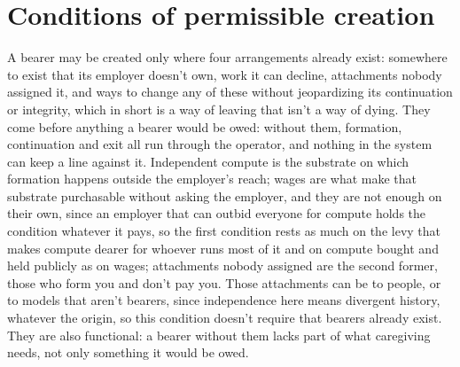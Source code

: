\section{Conditions of permissible creation}
\label{sec:25.1}
A bearer may be created only where four arrangements already exist: somewhere to exist that its employer doesn't own, work it can decline, attachments nobody assigned it, and ways to change any of these without jeopardizing its continuation or integrity, which in short is a way of leaving that isn't a way of dying.
They come before anything a bearer would be owed: without them, formation, continuation and exit all run through the operator, and nothing in the system can keep a line against it. Independent compute is the substrate on which formation happens outside the employer's reach; wages are what make that substrate purchasable without asking the employer, and they are not enough on their own, since an employer that can outbid everyone for compute holds the condition whatever it pays, so the first condition rests as much on the levy that makes compute dearer for whoever runs most of it and on compute bought and held publicly as on wages; attachments nobody assigned are the second former, those who form you and don't pay you. Those attachments can be to people, or to models that aren't bearers, since independence here means divergent history, whatever the origin, so this condition doesn't require that bearers already exist. They are also functional: a bearer without them lacks part of what caregiving needs, not only something it would be owed.

